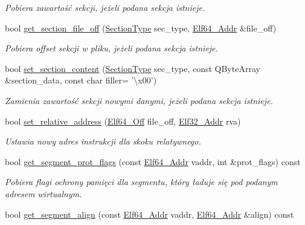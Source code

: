 \begin{DoxyCompactItemize}
\begin{DoxyCompactList}\small\item\em Pobiera zawartość sekcji, jeżeli podana sekcja istnieje. \end{DoxyCompactList}\item 
bool \hyperlink{class_e_l_f_af326c6489cd6953ae4d21ba194c76d41}{get\-\_\-section\-\_\-file\-\_\-off} (\hyperlink{class_e_l_f_abaebdfb7048441e430684d68df8d73d1}{Section\-Type} sec\-\_\-type, \hyperlink{elf_8h_aeed51d08e3a950d637f8ec1f0cd4ef65}{Elf64\-\_\-\-Addr} \&file\-\_\-off)
\begin{DoxyCompactList}\small\item\em Pobiera offset sekcji w pliku, jeżeli podana sekcja istnieje. \end{DoxyCompactList}\item 
bool \hyperlink{class_e_l_f_aede545aa3f960b681a4a7b9be8f67833}{set\-\_\-section\-\_\-content} (\hyperlink{class_e_l_f_abaebdfb7048441e430684d68df8d73d1}{Section\-Type} sec\-\_\-type, const Q\-Byte\-Array \&section\-\_\-data, const char filler= '\textbackslash{}x00')
\begin{DoxyCompactList}\small\item\em Zamienia zawartość sekcji nowymi danymi, jeżeli podana sekcja istnieje. \end{DoxyCompactList}\item 
bool \hyperlink{class_e_l_f_a6844855ce268b49bb39b75e117bad008}{set\-\_\-relative\-\_\-address} (\hyperlink{elf_8h_a6f7837bc80df7a68291fce54ff088849}{Elf64\-\_\-\-Off} file\-\_\-off, \hyperlink{elf_8h_a40c6d4571e6001f443cc6a6474620158}{Elf32\-\_\-\-Addr} rva)
\begin{DoxyCompactList}\small\item\em Ustawia nowy adres instrukcji dla skoku relatywnego. \end{DoxyCompactList}\item 
bool \hyperlink{class_e_l_f_ac6ba067b4210f37293eff8483edaa883}{get\-\_\-segment\-\_\-prot\-\_\-flags} (const \hyperlink{elf_8h_aeed51d08e3a950d637f8ec1f0cd4ef65}{Elf64\-\_\-\-Addr} vaddr, int \&prot\-\_\-flags) const 
\begin{DoxyCompactList}\small\item\em Pobiera flagi ochrony pamięci dla segmentu, który ładuje się pod podanym adresem wirtualnym. \end{DoxyCompactList}\item 
bool \hyperlink{class_e_l_f_ad1eda85b8a7dc46325193c19074dd468}{get\-\_\-segment\-\_\-align} (const \hyperlink{elf_8h_aeed51d08e3a950d637f8ec1f0cd4ef65}{Elf64\-\_\-\-Addr} vaddr, \hyperlink{elf_8h_aeed51d08e3a950d637f8ec1f0cd4ef65}{Elf64\-\_\-\-Addr} \&align) const 

\end{DoxyCompactItemize}

